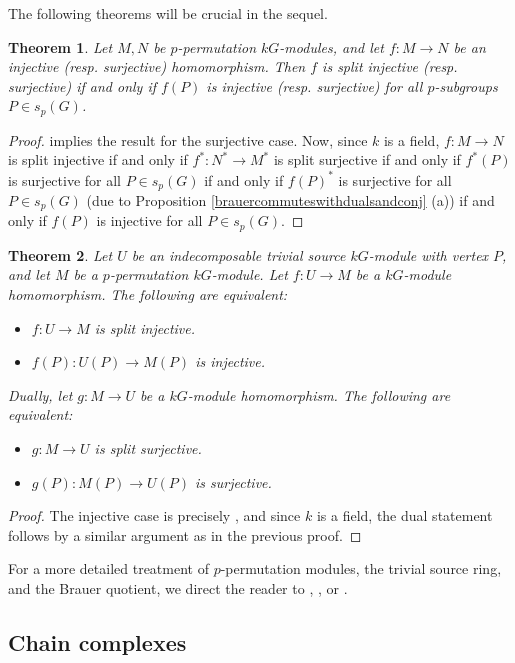 \documentclass[10pt,letterpaper, boxed, cm]{amsart}
\newtheorem{theorem}{Theorem}[section]
\theoremstyle{remark}
\theoremstyle{definition}
\begin{document}
	The following theorems will be crucial in the sequel.

	\begin{theorem}\label{permsplit}
		Let $M, N$ be $p$-permutation $kG$-modules, and let $f: M \to N$ be an injective (resp. surjective) homomorphism. Then $f$ is split injective (resp. surjective) if and only if $f(P)$ is injective (resp. surjective) for all $p$-subgroups $P\in s_p(G)$.
	\end{theorem}
    \begin{proof}
        \cite[Proposition 5.8.11]{L181} implies the result for the surjective case. Now, since $k$ is a field, $f: M\to N$ is split injective if and only if $f^*: N^* \to M^*$ is split surjective if and only if $f^*(P)$ is surjective for all $P \in s_p(G)$ if and only if $f(P)^*$ is surjective for all $P \in s_p(G)$ (due to Proposition \ref{brauercommuteswithdualsandconj} (a)) if and only if $f(P)$ is injective for all $P \in s_p(G)$.
    \end{proof}

	\begin{theorem}\label{ppermvertex}
		Let $U$ be an indecomposable trivial source $kG$-module with vertex $P$, and let $M$ be a $p$-permutation $kG$-module. Let $f: U \to M$ be a $kG$-module homomorphism. The following are equivalent:
		\begin{itemize}
			\item $f: U \to M$ is split injective.
			\item $f(P): U(P) \to M(P)$ is injective.
		\end{itemize}
		Dually, let $g: M\to U$ be a $kG$-module homomorphism. The following are equivalent:
		\begin{itemize}
			\item $g: M \to U$ is split surjective.
			\item $g(P): M(P)\to U(P)$ is surjective.
		\end{itemize}
	\end{theorem}
    \begin{proof}
        The injective case is precisely \cite[Propositionn 5.10.7]{L181}, and since $k$ is a field, the dual statement follows by a similar argument as in the previous proof.
    \end{proof}

	For a more detailed treatment of $p$-permutation modules, the trivial source ring, and the Brauer quotient, we direct the reader to \cite{CL23}, \cite{L181}, or \cite{BC23}.

	\subsection{Chain complexes}
\end{document}
